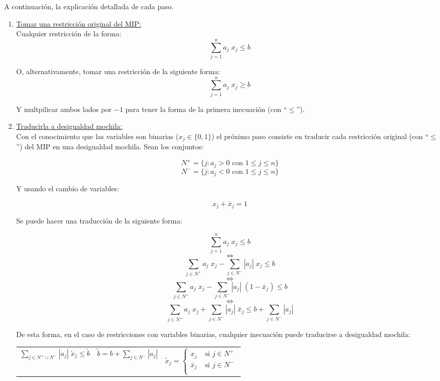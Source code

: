A continuación, la explicación detallada de cada paso.
\newpage

\begin{enumerate}
\item \underline{Tomar una restricción original del MIP:}\\
Cualquier restricción de la forma:
$$\overset{n}{\underset{j=1}{\sum}} a_j\;x_j \leq b$$

O, alternativamente, tomar una restricción de la siguiente forma:
$$\overset{n}{\underset{j=1}{\sum}} a_j\;x_j \geq b$$

Y multpilicar ambos lados por $-1$ para tener la forma de la primera inecuación (con ``$\leq$'').

\item \underline{Traducirla a desigualdad mochila:}\\
Con el conocimiento que las variables son binarias ($x_j\in\{0,1\}$) el próximo paso consiste en traducir cada restricción original (con ``$\leq$'') del MIP en una desigualdad mochila. Sean los conjuntos:

$$N^+ = \{j: a_j > 0 \text{ con } 1\leq j \leq n\}$$
$$N^- = \{j: a_j < 0 \text{ con } 1\leq j \leq n\}$$

Y usando el cambio de variables:

$$x_j + \bar{x}_j = 1$$

Se puede hacer una traducción de la siguiente forma:

$$\overset{n}{\underset{j=1}{\sum}} a_j\;x_j \leq b$$
$$\Leftrightarrow$$
$$\overset{}{\underset{j \in N^+}{\sum}} a_j\;x_j - \overset{}{\underset{j \in N^-}{\sum}} |a_j|\;x_j \leq b$$
$$\Leftrightarrow$$
$$\overset{}{\underset{j \in N^+}{\sum}} a_j\;x_j - \overset{}{\underset{j \in N^-}{\sum}} |a_j|\;(1-\bar{x}_j) \leq b$$
$$\Leftrightarrow$$
$$\overset{}{\underset{j \in N^+}{\sum}} a_j\;x_j + \overset{}{\underset{j \in N^-}{\sum}} |a_j|\;\bar{x}_j \leq b + \overset{}{\underset{j \in N^-}{\sum}} |a_j|$$

De esta forma, en el caso de restricciones con variables binarias, cualquier inecuación puede traducirse a desigualdad mochila:

{
\centering
\begin{tabular}{p{4cm}p{4cm}p{4cm}}
$\overset{}{\underset{j \in N^+ \cup N^-}{\sum}} |a_j|\;\tilde{x}_j \leq \tilde{b}$
&
$\tilde{b} = b + \overset{}{\underset{j \in N^-}{\sum}} |a_j|$
&
$\tilde{x}_j = 
\begin{cases}
x_j & \text{ si } j \in N^+\\
\bar{x}_j & \text{ si } j \in N^-\\
\end{cases}$\\
\end{tabular}\\
\vspace{5mm}
}


\end{enumerate}
